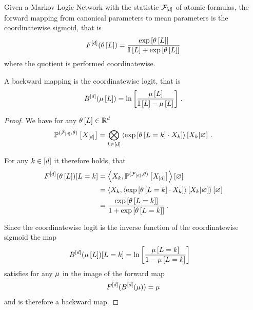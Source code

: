 \begin{theorem}
    Given a Markov Logic Network with the statistic $\mathcal{F}_{[d]}$ of atomic formulas, the forward mapping from canonical parameters to mean parameters is the coordinatewise sigmoid, that is
    \[ F^{[d]}(\theta\left[L\right]) = \frac{\mathrm{exp}\left[\theta\left[L\right]\right]}{\mathbb{I}\left[L\right]+\mathrm{exp}\left[\theta\left[L\right]\right]}   \]
    where the quotient is performed coordinatewise.

    A backward mapping is the coordinatewise logit, that is
    \[ B^{[d]}(\mu\left[L\right])
    = \ln \left[ \frac{
        \mu\left[L\right]
    }{
        \mathbb{I}\left[L\right]-\mu\left[L\right]
    } \right]  \, . \]
\end{theorem}
\begin{proof}
    We have for any $\theta\left[L\right]\in\mathbb{R}^{d}$
    \[ \mathbb{P}^{(\mathcal{F}_{[d]},\theta)}\left[X_{[d]}\right]
    = \bigotimes_{k\in[d]} \left\langle \mathrm{exp}\left[\theta\left[L=k\right]\cdot X_{k}\right]\right\rangle \left[ X_{k} | \varnothing \right]  \, . \]


    For any $k\in[d]$ it therefore holds, that
    \begin{align*}
        F^{[d]}(\theta\left[L\right])[L=k]
        &=\left\langle X_{k},  \mathbb{P}^{(\mathcal{F}_{[d]},\theta)}\left[X_{[d]}\right]\right\rangle \left[ \varnothing \right] \\
        &=\left\langle X_{k},  \left\langle \mathrm{exp}\left[\theta\left[L=k\right]\cdot X_{k}\right]\right\rangle \left[ X_{k} | \varnothing \right]\right\rangle \left[ \varnothing \right] \\
        & = \frac{\mathrm{exp}\left[\theta\left[L=k\right]\right]}{1+\mathrm{exp}\left[\theta\left[L=k\right]\right]} \, .
    \end{align*}

    Since the coordinatewise logit is the inverse function of the coordinatewise sigmoid the map
    \begin{align*}
        B^{[d]}(\mu\left[L\right])[L=k]
        & = \ln \left[ \frac{\mu\left[L=k\right]}{1- \mu\left[L=k\right]} \right]
    \end{align*}
    satisfies for any $\mu$ in the image of the forward map
    \begin{align*}
        F^{[d]}(B^{[d]}(\mu)) = \mu
    \end{align*}
    and is therefore a backward map.
\end{proof}


